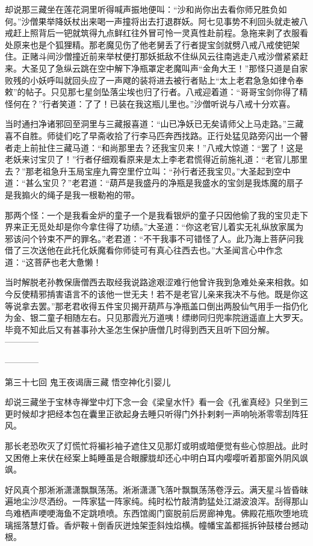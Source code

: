 \documentclass[12pt,UTF8]{ctexbook}
\begin{document}
却说那三藏坐在莲花洞里听得喊声振地便叫：“沙和尚你出去看你师兄胜负如何。”沙僧果举降妖杖出来喝一声撞将出去打退群妖。阿七见事势不利回头就走被八戒赶上照背后一钯就筑得九点鲜红往外冒可怜一灵真性赴前程。急拖来剥了衣服看处原来也是个狐狸精。那老魔见伤了他老舅丢了行者提宝剑就劈八戒八戒使钯架住。正赌斗间沙僧撞近前来举杖便打那妖抵敌不住纵风云往南逃走八戒沙僧紧紧赶来。大圣见了急纵云跳在空中解下净瓶罩定老魔叫声“金角大王！”那怪只道是自家败残的小妖呼叫就回头应了一声飕的装将进去被行者贴上“太上老君急急如律令奉敕”的帖子。只见那七星剑坠落尘埃也归了行者。八戒迎着道：“哥哥宝剑你得了精怪何在？”行者笑道：了了！已装在我这瓶儿里也。”沙僧听说与八戒十分欢喜。

当时通扫净诸邪回至洞里与三藏报喜道：“山已净妖已无矣请师父上马走路。”三藏喜不自胜。师徒们吃了早斋收拾了行李马匹奔西找路。正行处猛见路旁闪出一个瞽者走上前扯住三藏马道：“和尚那里去？还我宝贝来！”八戒大惊道：“罢了！这是老妖来讨宝贝了！”行者仔细观看原来是太上李老君慌得近前施礼道：“老官儿那里去？”那老祖急升玉局宝座九霄空里佇立叫：“孙行者还我宝贝。”大圣起到空中道：“甚么宝贝？”老君道：“葫芦是我盛丹的净瓶是我盛水的宝剑是我炼魔的扇子是我搧火的绳子是我一根勒袍的带。

那两个怪：一个是我看金炉的童子一个是我看银炉的童子只因他偷了我的宝贝走下界来正无觅处却是你今拿住得了功绩。”大圣道：“你这老官儿着实无礼纵放家属为邪该问个钤束不严的罪名。”老君道：“不干我事不可错怪了人。此乃海上菩萨问我借了三次送他在此托化妖魔看你师徒可有真心往西去也。”大圣闻言心中作念道：“这菩萨也老大惫懒！

当时解脱老孙教保唐僧西去取经我说路途艰涩难行他曾许我到急难处亲来相救。如今反使精邪掯害语言不的该他一世无夫！若不是老官儿亲来我决不与他。既是你这等说拿去罢。”那老君收得五件宝贝揭开葫芦与净瓶盖口倒出两股仙气用手一指仍化为金、银二童子相随左右。只见那霞光万道咦！缥缈同归兜率院逍遥直上大罗天。毕竟不知此后又有甚事孙大圣怎生保护唐僧几时得到西天且听下回分解。
------------


------------

第三十七回 鬼王夜谒唐三藏 悟空神化引婴儿

却说三藏坐于宝林寺禅堂中灯下念一会《梁皇水忏》看一会《孔雀真经》只坐到三更时候却才把经本包在囊里正欲起身去睡只听得门外扑剌剌一声响喨淅零零刮阵狂风。

那长老恐吹灭了灯慌忙将褊衫袖子遮住又见那灯或明或暗便觉有些心惊胆战。此时又困倦上来伏在经案上盹睡虽是合眼朦胧却还心中明白耳内嘤嘤听着那窗外阴风飒飒。

好风真个那淅淅潇潇飘飘荡荡。淅淅潇潇飞落叶飘飘荡荡卷浮云。满天星斗皆昏昧遍地尘沙尽洒纷。一阵家猛一阵家纯。纯时松竹敲清韵猛处江湖波浪浑。刮得那山鸟难栖声哽哽海鱼不定跳喷喷。东西馆阁门窗脱前后房廊神鬼。佛殿花瓶吹堕地琉璃摇落慧灯昏。香炉鞍＋倒香灰迸烛架歪斜烛焰横。幢幡宝盖都摇拆钟鼓楼台撼动根。
\end{document}
